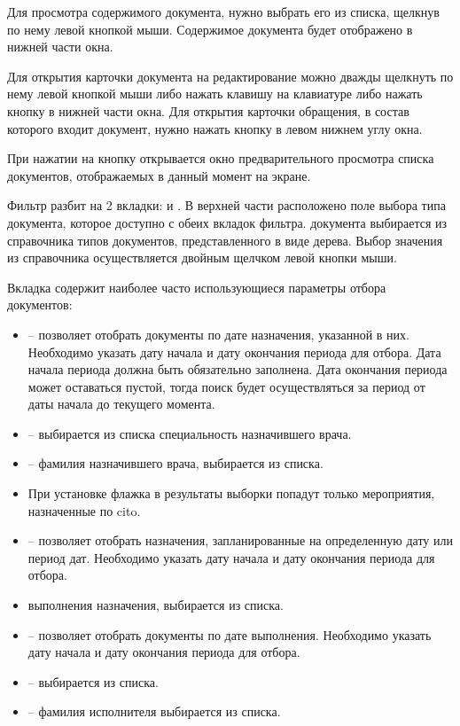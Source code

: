 Для просмотра содержимого документа, нужно выбрать его из списка, щелкнув по нему левой кнопкой мыши. Содержимое документа будет отображено в нижней части окна.

Для открытия карточки документа на редактирование можно дважды щелкнуть по нему левой кнопкой мыши либо нажать клавишу  на клавиатуре либо нажать кнопку   в нижней части окна. Для открытия карточки обращения, в состав которого входит документ, нужно нажать кнопку  в левом нижнем углу окна.

При нажатии на кнопку  открывается окно предварительного просмотра списка документов, отображаемых в данный момент на экране.

Фильтр разбит на 2 вкладки:  и . В верхней части расположено поле выбора типа документа, которое доступно с обеих вкладок фильтра.  документа выбирается из справочника типов документов, представленного в виде дерева. Выбор значения из справочника осуществляется двойным щелчком левой кнопки мыши.

Вкладка  содержит наиболее часто использующиеся параметры отбора документов:
\begin{itemize}
 \item {} – позволяет отобрать документы по дате назначения, указанной в них. Необходимо указать дату начала и дату окончания периода для отбора. Дата начала периода должна быть обязательно заполнена. Дата окончания периода может оставаться пустой, тогда поиск будет осуществляться за период от даты начала до текущего момента.
 \item {} – выбирается из списка специальность назначившего врача.
 \item {} – фамилия назначившего врача, выбирается из списка.
 \item При установке флажка  в результаты выборки попадут только мероприятия, назначенные по cito.
 \item {} – позволяет отобрать назначения, запланированные на определенную дату или период дат. Необходимо указать дату начала и дату окончания периода для отбора.
 \item {} выполнения назначения, выбирается из списка.
 \item {} – позволяет отобрать документы по дате выполнения. Необходимо указать дату начала и дату окончания периода для отбора.
 \item {} – выбирается из списка.
 \item {} – фамилия исполнителя выбирается из списка.
\end{itemize}

